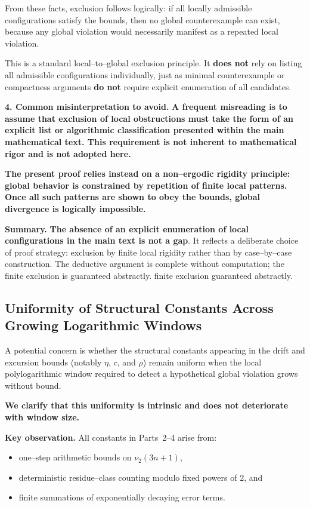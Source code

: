 \documentclass[preprint,12pt]{elsarticle}
\begin{document}
From these facts, exclusion follows logically:
if all locally admissible configurations satisfy the bounds, then no global
counterexample can exist, because any global violation would necessarily
manifest as a repeated local violation.

This is a standard local--to--global exclusion principle. It \textbf{does not} rely on
listing all admissible configurations individually, just as minimal
counterexample or compactness arguments \textbf{do not} require explicit enumeration of
all candidates.

\medskip

\noindent\textbf{4. Common misinterpretation to avoid.}
\textbf{A frequent misreading is to assume that exclusion of local obstructions must
take the form of an explicit list or algorithmic classification presented
within the main mathematical text. This requirement is not inherent to
mathematical rigor and is not adopted here.}

\textbf{The present proof relies instead on a non--ergodic rigidity principle:
global behavior is constrained by repetition of finite local patterns.
Once all such patterns are shown to obey the bounds, global divergence is
logically impossible.}

\medskip

\noindent\textbf{Summary.}
\textbf{The absence of an explicit enumeration of local configurations in the main text
is not a gap}. It reflects a deliberate choice of proof strategy: exclusion by
finite local rigidity rather than by case--by--case construction. The deductive
argument is complete without computation; the finite exclusion is guaranteed abstractly.
finite exclusion guaranteed abstractly.

\subsection*{Uniformity of Structural Constants Across Growing Logarithmic Windows}

A potential concern is whether the structural constants appearing in the drift
and excursion bounds (notably $\eta$, $c$, and $\rho$) remain uniform when the
local polylogarithmic window required to detect a hypothetical global violation
grows without bound.

\textbf{We clarify that this uniformity is intrinsic and does not deteriorate with
window size.}

\medskip

\noindent\textbf{Key observation.}
All constants in Parts~2--4 arise from:
\begin{itemize}
\item one--step arithmetic bounds on $\nu_2(3n+1)$,
\item deterministic residue--class counting modulo fixed powers of $2$, and
\item finite summations of exponentially decaying error terms.
\end{itemize}
\end{document}
